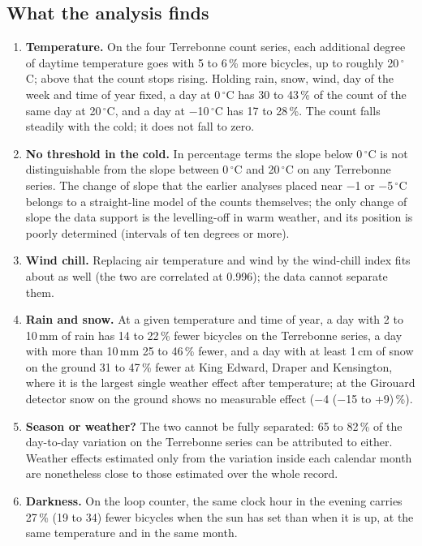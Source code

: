 \documentclass[11pt,a4paper]{article}
\begin{document}
\subsection*{What the analysis finds}
\begin{enumerate}
\item \textbf{Temperature.} On the four Terrebonne count series, each additional degree of daytime temperature goes with 5 to 6\,\% more bicycles, up to roughly 20\,$^\circ$C; above that the count stops rising. Holding rain, snow, wind, day of the week and time of year fixed, a day at 0\,$^\circ$C has 30 to 43\,\% of the count of the same day at 20\,$^\circ$C, and a day at $-$10\,$^\circ$C has 17 to 28\,\%. The count falls steadily with the cold; it does not fall to zero.
\item \textbf{No threshold in the cold.} In percentage terms the slope below 0\,$^\circ$C is not distinguishable from the slope between 0\,$^\circ$C and 20\,$^\circ$C on any Terrebonne series. The change of slope that the earlier analyses placed near $-$1 or $-$5\,$^\circ$C belongs to a straight-line model of the counts themselves; the only change of slope the data support is the levelling-off in warm weather, and its position is poorly determined (intervals of ten degrees or more).
\item \textbf{Wind chill.} Replacing air temperature and wind by the wind-chill index fits about as well (the two are correlated at 0.996); the data cannot separate them.
\item \textbf{Rain and snow.} At a given temperature and time of year, a day with 2 to 10\,mm of rain has 14 to 22\,\% fewer bicycles on the Terrebonne series, a day with more than 10\,mm 25 to 46\,\% fewer, and a day with at least 1\,cm of snow on the ground 31 to 47\,\% fewer at King Edward, Draper and Kensington, where it is the largest single weather effect after temperature; at the Girouard detector snow on the ground shows no measurable effect ($-$4 ($-$15 to +9)\,\%).
\item \textbf{Season or weather?} The two cannot be fully separated: 65 to 82\,\% of the day-to-day variation on the Terrebonne series can be attributed to either. Weather effects estimated only from the variation inside each calendar month are nonetheless close to those estimated over the whole record.
\item \textbf{Darkness.} On the loop counter, the same clock hour in the evening carries 27\,\% (19 to 34) fewer bicycles when the sun has set than when it is up, at the same temperature and in the same month.

\end{enumerate}
\end{document}
